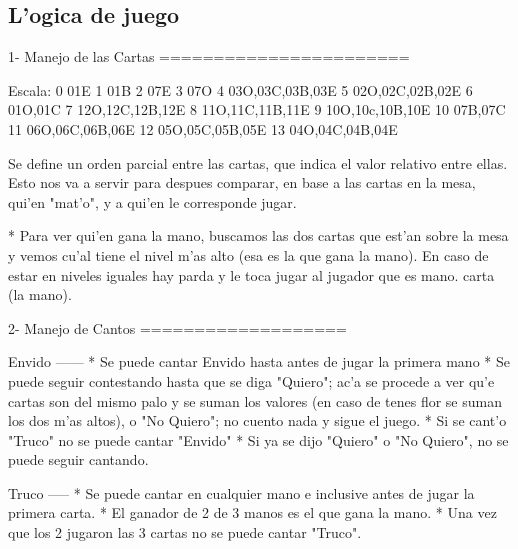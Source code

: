 \subsection{L'ogica de juego}

1- Manejo de las Cartas
=======================

Escala:
0 01E
1 01B
2 07E
3 07O
4 03O,03C,03B,03E
5 02O,02C,02B,02E
6 01O,01C
7 12O,12C,12B,12E
8 11O,11C,11B,11E
9 10O,10c,10B,10E
10  07B,07C
11  06O,06C,06B,06E
12  05O,05C,05B,05E
13  04O,04C,04B,04E

  Se define un orden parcial entre las cartas, que indica el valor relativo entre ellas. Esto nos va a servir para despues comparar, en base a las cartas en la mesa, qui'en "mat'o", y a qui'en le corresponde jugar.

  * Para ver qui'en gana la mano, buscamos las dos cartas que est'an sobre la mesa y vemos cu'al tiene el nivel m'as alto (esa es la que gana la mano). En caso de estar en niveles iguales hay parda y le toca jugar al jugador que es mano.
carta (la mano).


2- Manejo de Cantos
===================

Envido
------
  * Se puede cantar Envido hasta antes de jugar la primera mano
  * Se puede seguir contestando hasta que se diga "Quiero"; ac'a se procede a ver qu'e cartas son del mismo palo y se suman los valores (en caso de tenes flor se suman los dos m'as altos), o "No Quiero"; no cuento nada y sigue el juego.
  * Si se cant'o "Truco" no se puede cantar "Envido"
  * Si ya se dijo "Quiero" o "No Quiero", no se puede seguir cantando.

Truco
-----
  * Se puede cantar en cualquier mano e inclusive antes de jugar la primera carta.
  * El ganador de 2 de 3 manos es el que gana la mano.
  * Una vez que los 2 jugaron las 3 cartas no se puede cantar "Truco".

